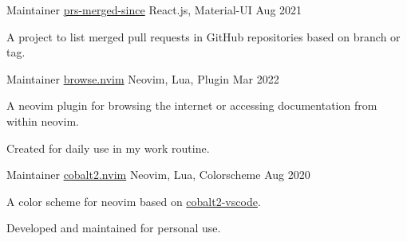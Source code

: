 

\begin{cventries}


  \cventry
    {Maintainer}
    {\href{https://github.com/lalitmee/prs-merged-since}{prs-merged-since}}
    {React.js, Material-UI}
    {Aug 2021}
    {
      \begin{cvitems}
        \item {A project to list merged pull requests in GitHub repositories based on branch or tag.}
      \end{cvitems}
     }


  \cventry
    {Maintainer}
    {\href{https://github.com/lalitmee/browse.nvim}{browse.nvim}}
    {Neovim, Lua, Plugin}
    {Mar 2022}
    {
      \begin{cvitems}
          \item {A neovim plugin for browsing the internet or accessing documentation from within neovim.}
          \item {Created for daily use in my work routine.}
      \end{cvitems}
    }


    \cventry
    {Maintainer}
    {\href{https://github.com/lalitmee/cobalt2.nvim}{cobalt2.nvim}}
    {Neovim, Lua, Colorscheme}
    {Aug 2020}
    {
      \begin{cvitems}
        \item {A color scheme for neovim based on \href{https://github.com/wesbos/cobalt2-vscode}{cobalt2-vscode}.}
        \item {Developed and maintained for personal use.}
      \end{cvitems}
     }

     
\end{cventries}
